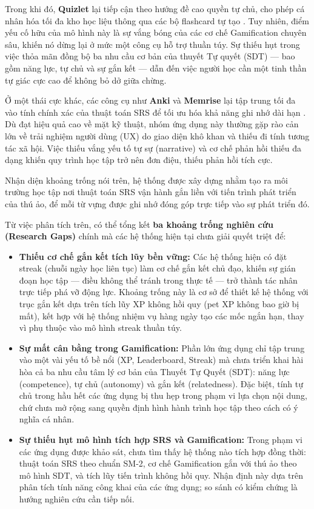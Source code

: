 Trong khi đó, \textbf{Quizlet} lại tiếp cận theo hướng đề cao quyền tự chủ, cho phép cá nhân hóa tối đa kho học liệu thông qua các bộ flashcard tự tạo \cite{QuizletLearn2024}. Tuy nhiên, điểm yếu cố hữu của mô hình này là sự vắng bóng của các cơ chế Gamification chuyên sâu, khiến nó dừng lại ở mức một công cụ hỗ trợ thuần túy. Sự thiếu hụt trong việc thỏa mãn đồng bộ ba nhu cầu cơ bản của thuyết Tự quyết (SDT) — bao gồm năng lực, tự chủ và sự gắn kết — dẫn đến việc người học cần một tinh thần tự giác cực cao để không bỏ dở giữa chừng.

Ở một thái cực khác, các công cụ như \textbf{Anki} và \textbf{Memrise} lại tập trung tối đa vào tính chính xác của thuật toán SRS để tối ưu hóa khả năng ghi nhớ dài hạn \cite{AnkiWeb2024, MemriseHelp2024}. Dù đạt hiệu quả cao về mặt kỹ thuật, nhóm ứng dụng này thường gặp rào cản lớn về trải nghiệm người dùng (UX) do giao diện khô khan và thiếu đi tính tương tác xã hội. Việc thiếu vắng yếu tố tự sự (narrative) và cơ chế phản hồi thiếu đa dạng khiến quy trình học tập trở nên đơn điệu, thiếu phản hồi tích cực.

Nhận diện khoảng trống nói trên, hệ thống được xây dựng nhằm tạo ra môi trường học tập nơi thuật toán SRS vận hành gắn liền với tiến trình phát triển của thú ảo, để mỗi từ vựng được ghi nhớ đóng góp trực tiếp vào sự phát triển đó.

Từ việc phân tích trên, có thể tổng kết \textbf{ba khoảng trống nghiên cứu (Research Gaps)} chính mà các hệ thống hiện tại chưa giải quyết triệt để:

\begin{itemize}
\item \textbf{Thiếu cơ chế gắn kết tích lũy bền vững:} Các hệ thống hiện có đặt streak (chuỗi ngày học liên tục) làm cơ chế gắn kết chủ đạo, khiến sự gián đoạn học tập --- điều không thể tránh trong thực tế --- trở thành tác nhân trực tiếp phá vỡ động lực. Khoảng trống này là cơ sở để thiết kế hệ thống với trục gắn kết dựa trên tích lũy XP không hồi quy (pet XP không bao giờ bị mất), kết hợp với hệ thống nhiệm vụ hàng ngày tạo các mốc ngắn hạn, thay vì phụ thuộc vào mô hình streak thuần túy.
\item \textbf{Sự mất cân bằng trong Gamification:} Phần lớn ứng dụng chỉ tập trung vào một vài yếu tố bề nổi (XP, Leaderboard, Streak) mà chưa triển khai hài hòa cả ba nhu cầu tâm lý cơ bản của Thuyết Tự Quyết (SDT): năng lực (competence), tự chủ (autonomy) và gắn kết (relatedness). Đặc biệt, tính tự chủ trong hầu hết các ứng dụng bị thu hẹp trong phạm vi lựa chọn nội dung, chứ chưa mở rộng sang quyền định hình hành trình học tập theo cách có ý nghĩa cá nhân.
\item \textbf{Sự thiếu hụt mô hình tích hợp SRS và Gamification:} Trong phạm vi các ứng dụng được khảo sát, chưa tìm thấy hệ thống nào tích hợp đồng thời: thuật toán SRS theo chuẩn SM-2, cơ chế Gamification gắn với thú ảo theo mô hình SDT, và tích lũy tiến trình không hồi quy. Nhận định này dựa trên phân tích tính năng công khai của các ứng dụng; so sánh có kiểm chứng là hướng nghiên cứu cần tiếp nối.
\end{itemize}

